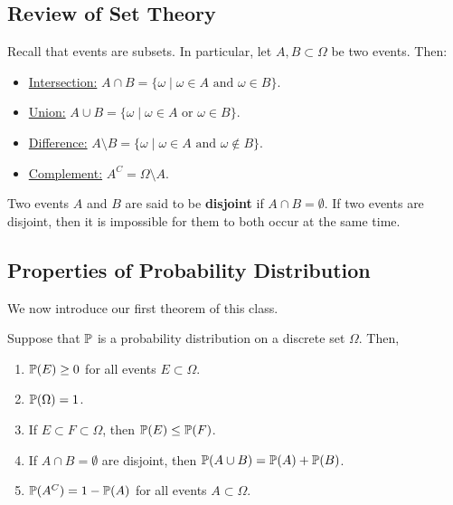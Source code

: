 \subsection{Review of Set Theory}
Recall that events are subsets. In particular, let $A, B \subset \Omega$ be two events. Then: 
\begin{itemize}
    \item \underline{Intersection:} $A \cap B = \{\omega \mid \omega \in A \text{ and } \omega \in B\}$. 
    \item \underline{Union:} $A \cup B = \{\omega \mid \omega \in A \text{ or } \omega \in B\}$.
    \item \underline{Difference:} $A \setminus B = \{\omega \mid \omega \in A \text{ and } \omega \notin B\}$.
    \item \underline{Complement:} $A^C = \Omega \setminus A$. 
\end{itemize}
Two events $A$ and $B$ are said to be \textbf{disjoint} if $A \cap B = \emptyset$. If two events are disjoint, then it is impossible for them to both occur at the same time. 


\subsection{Properties of Probability Distribution}
We now introduce our first theorem of this class. 
\begin{theorem}{}{}
    Suppose that $\mathbb{P}$ is a probability distribution on a discrete set $\Omega$. Then,
    \begin{enumerate}
        \item $\mathbb{P}(E) \geq 0$ for all events $E \subset \Omega$. 
        \item $\mathbb{P}(\Omega) = 1$. 
        \item If $E \subset F \subset \Omega$, then $\mathbb{P}(E) \leq \mathbb{P}(F)$. 
        \item If $A \cap B = \emptyset$ are disjoint, then $\mathbb{P}(A \cup B) = \mathbb{P}(A) + \mathbb{P}(B)$.
        \item $\mathbb{P}(A^C) = 1 - \mathbb{P}(A)$ for all events $A \subset \Omega$. 
    \end{enumerate}
\end{theorem}

